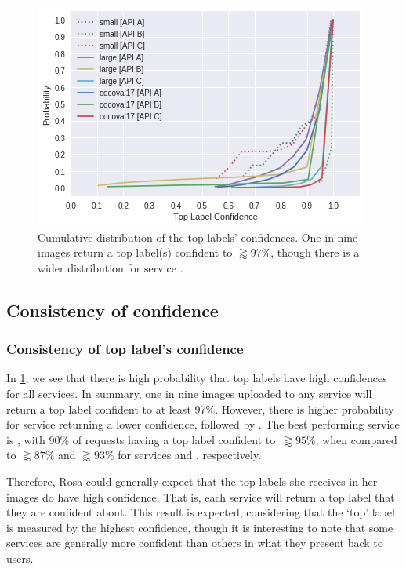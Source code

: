 \begin{figure}[p]
  \centering
  \includegraphics[width=0.75\linewidth]{topconfidence-cdf}
  \caption[Cumulative distribution of top label confidences]{Cumulative distribution of the top labels' confidences. One in nine images return a top label(s) confident to $\gtrapprox97\%$, though there is a wider distribution for service \googleapi{}.}  
  \label{icsme2019:fig:topconfidence-cdf}
\end{figure}

\subsection{Consistency of confidence}

\subsubsection{Consistency of top label's confidence}

In \cref{icsme2019:fig:topconfidence-cdf}, we see that there is high probability that top labels have high confidences for all services. In summary, one in nine images uploaded to any service will return a top label confident to at least 97\%. However, there is higher probability for service \googleapi{} returning a lower confidence, followed by \azureapi{}. The best performing service is \awsapi{}, with 90\% of requests having a top label confident to~$\gtrapprox95\%$, when compared to $\gtrapprox87\%$ and $\gtrapprox93\%$ for services \googleapi{} and \azureapi{}, respectively.

Therefore, Rosa could generally expect that the top labels she receives in her images do have high confidence. That is, each service will return a top label that they are confident about. This result is expected, considering that the `top' label is measured by the highest confidence, though it is interesting to note that some services are generally more confident than others in what they present back to users.

